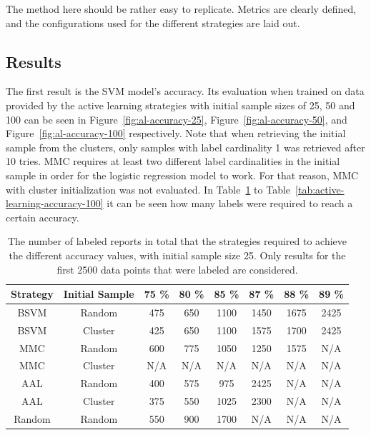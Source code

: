 The method here should be rather easy to replicate.
Metrics are clearly defined, and the configurations used for the different strategies are laid out.

\subsection{Results}

The first result is the SVM model's accuracy.
Its evaluation when trained on data provided by the active learning strategies with initial sample sizes of 25, 50 and 100 can be seen in Figure~\ref{fig:al-accuracy-25}, Figure~\ref{fig:al-accuracy-50}, and Figure~\ref{fig:al-accuracy-100} respectively.
Note that when retrieving the initial sample from the clusters, only samples with label cardinality 1 was retrieved after 10 tries.
MMC requires at least two different label cardinalities in the initial sample in order for the logistic regression model to work.
For that reason, MMC with cluster initialization was not evaluated.
In Table~\ref{tab:active-learning-accuracy-25} to Table~\ref{tab:active-learning-accuracy-100} it can be seen how many labels were required to reach a certain accuracy.


\begin{table}
    \centering
    \begin{tabular}{|cccccccc|}
        \hline
        \textbf{Strategy} & \textbf{Initial Sample} & \textbf{75 \%} & \textbf{80 \%} & \textbf{85 \%} & \textbf{87 \%} & \textbf{88 \%} & \textbf{89 \%}\\
        \hline
        BSVM & Random & 475 & 650 & 1100 & 1450 & 1675 & 2425\\
        BSVM & Cluster & 425 & 650 & 1100 & 1575 & 1700 & 2425\\
        MMC & Random & 600 & 775 & 1050 & 1250 & 1575 & N/A\\
        MMC & Cluster & N/A & N/A & N/A & N/A & N/A & N/A\\
        AAL & Random & 400 & 575 & 975 & 2425 & N/A & N/A\\
        AAL & Cluster & 375 & 550 & 1025 & 2300 & N/A & N/A\\
        Random & Random & 550 & 900 & 1700 & N/A & N/A & N/A\\
        \hline
    \end{tabular}
    \caption{The number of labeled reports in total that the strategies required to achieve the different accuracy values, with initial sample size 25. Only results for the first 2500 data points that were labeled are considered.}
    \label{tab:active-learning-accuracy-25}
\end{table}

